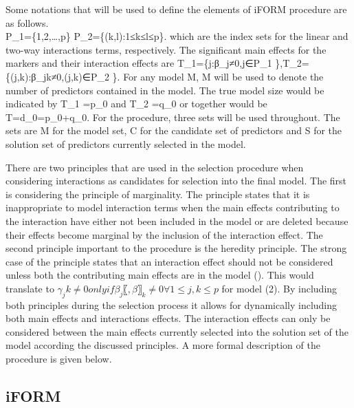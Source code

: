 \documentclass[11pt,]{book}
\theoremstyle{definition}
\theoremstyle{definition}
\theoremstyle{remark}
\begin{document}
Some notations that will be used to define the elements of
\cite{hao2014interaction} iFORM procedure are as follows.\\
P\_1=\{1,2,\ldots{},p\} P\_2=\{(k,l):1≤k≤l≤p\}. which are the index sets
for the linear and two-way interactions terms, respectively. The
significant main effects for the markers and their interaction effects
are T\_1=\{j:β\_j≠0,j∈P\_1 \},T\_2=\{(j,k):β\_jk≠0,(j,k)∈P\_2 \}. For
any model M, \textbar{}M\textbar{} will be used to denote the number of
predictors contained in the model. The true model size would be
indicated by \textbar{}T\_1 \textbar{}=p\_0 and \textbar{}T\_2
\textbar{}=q\_0 or together would be
\textbar{}T\textbar{}=d\_0=p\_0+q\_0. For the procedure, three sets will
be used throughout. The sets are M for the model set, C for the
candidate set of predictors and S for the solution set of predictors
currently selected in the model.

There are two principles that are used in the selection procedure when
considering interactions as candidates for selection into the final
model. The first is considering the principle of marginality. The
principle states that it is inappropriate to model interaction terms
when the main effects contributing to the interaction have either not
been included in the model or are deleted because their effects become
marginal by the inclusion of the interaction effect. The second
principle important to the procedure is the heredity principle. The
strong case of the principle states that an interaction effect should
not be considered unless both the contributing main effects are in the
model (\cite{zhao2006model}). This would translate to
\(γ_jk≠0 only if β_j 〖,β〗_k≠0 ∀ 1≤j,k≤p\) for model (2). By including
both principles during the selection process it allows for dynamically
including both main effects and interactions effects. The interaction
effects can only be considered between the main effects currently
selected into the solution set of the model according the discussed
principles. A more formal description of the procedure is given below.

\subsection{iFORM}\label{iform}
\end{document}
